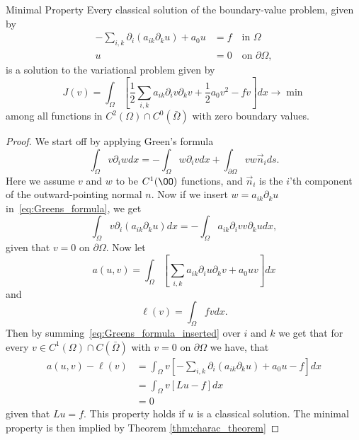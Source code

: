 \begin{thmx}{Minimal Property}
    Every classical solution of the boundary-value problem, given by
\begin{align}
    -\sum_{i,k} \partial_i (a_{ik}\partial_k u) + a_0 u &= f \quad \text{in } \Omega  \\
    u &= 0 \quad \text{on } \partial \Omega,
\end{align}
    is a solution to the variational problem given by
    \[
        J(v)=\int_\Omega [\frac{1}{2}\sum_{i,k} a_{ik} \partial_i v\partial_k v + \frac{1}{2} a_0 v^2 -fv]dx \longrightarrow \min
    \]
    among all functions in $C^2(\Omega)\cap C^0(\bar{\Omega})$ with zero boundary values. 
\end{thmx}
\begin{proof}
    We start off by applying Green's formula
    \begin{equation}
    \label{eq:Greens_formula}
        \int_\Omega v\partial_i w dx = -\int_\Omega w \partial_i v dx + \int_{\partial \Omega} v w \vec{n}_i ds.
    \end{equation}
    Here we assume $v$ and $w$ to be $C^1(\OO)$ functions, and $\vec{n}_i$ is the $i$'th component of the outward-pointing normal $n$.
    Now if we insert $w=a_{ik}\partial_k u$ in~\eqref{eq:Greens_formula}, we get
    \begin{equation}
    \label{eq:Greens_formula_inserted}
        \int_\Omega v\partial_i (a_{ik} \partial_k u) dx = -\int_\Omega a_{ik} \partial_i v v\partial_k u dx,
    \end{equation}
    given that $v=0$ on $\partial \Omega$.
    Now let 
    \begin{equation}
    \label{eq:a(u,v)}
        a(u,v) = \int_\Omega \left[\sum_{i,k} a_{ik} \partial_i u \partial_k v +a_0 uv \right]dx
    \end{equation}
    and
    \begin{equation}
    \label{eq:l(v)}
        \ell(v) = \int_\Omega fv dx.
    \end{equation}
    Then by summing~\eqref{eq:Greens_formula_inserted} over $i$ and $k$ we get that for every $v\in C^1(\Omega) \cap C(\bar{\Omega})$ with $v=0$ on $\partial \Omega$ we have, that 
    \begin{align}
        a(u,v) - \ell(v) &= \int_\Omega v\left[ -\sum_{i,k} \partial_i (a_{ik} \partial_k u) + a_0 u - f \right] dx \label{eq:min_prop_variational_problem}\\
        &= \int_\Omega v [Lu - f] dx \nonumber \\
        &= 0 \nonumber
    \end{align}
    given that $Lu = f$. This property holds if $u$ is a classical solution.
     The minimal property is then implied by Theorem \ref{thm:charac_theorem}
\end{proof}